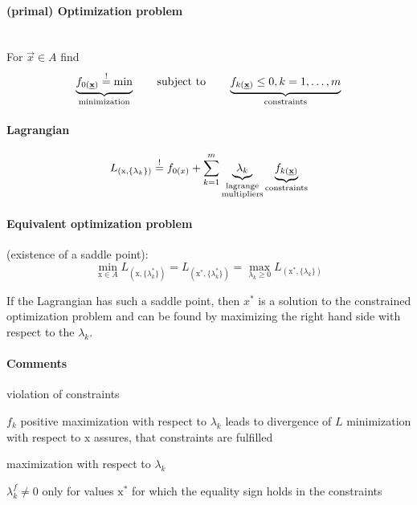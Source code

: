 \paragraph{(primal) Optimization problem}\mbox{}\\
For $\vec{x} \in A$ find
\begin{equation}
	\underbrace{ f_{0 (\underline{\mathbf{x}})} \stackrel{\mathrm{!}}{=} \min }_{\text{minimization}}
	\qquad \text{subject to} \qquad
			\underbrace{ f_{k (\underline{\mathbf{x}})} \leq 0, k = 1, \ldots, m 
				}_{\text{constraints}}
\end{equation}
\paragraph{Lagrangian}
\begin{equation}
	L_{(\mathrm{x}, \{ \lambda_k \} )} \stackrel{\mathrm{!}}{=} f_{0 (x)}
	+ \sum_{k = 1}^m \underbrace{ \lambda_k }_{
		\substack{\text{lagrange} \\ \text{multipliers}}}
	\underbrace{ f_{k (\underline{\mathbf{x}})} }_{\text{constraints}}
\end{equation}
\paragraph{Equivalent optimization problem} (existence of a saddle point):
\begin{equation}
	\min_{\mathrm{x} \in A} L_{(\mathrm{x}, \{ \lambda_k^*\})}
	= L_{(\mathrm{x}^*, \{ \lambda_k^* \})}
	= \max_{ \lambda_k \geq 0} L_{(\mathrm{x}^*, \{ \lambda_k \})}
\end{equation}
\begin{itemize}
\itR If the Lagrangian has such a saddle point, then $x^*$ is a solution to the constrained optimization problem and can be found by maximizing the right hand side with respect to the $\lambda_k$. 
\end{itemize}
\paragraph{Comments}
\begin{itemize}
	\itl violation of constraints 
	\begin{itemize}
		\itr $f_k$ positive 
		\itr maximization with respect to $\lambda_k$ leads to 
			divergence of $L$
		\itr minimization with respect to $\mathrm{x}$ assures, that
			constraints are fulfilled
	\end{itemize}
	\itl maximization with respect to $\lambda_k$
		\begin{center}
		$\lambda_k^f \neq 0$ only for values $\mathrm{x}^*$ for which
		the equality sign holds in the constraints
		\end{center}
\end{itemize}
